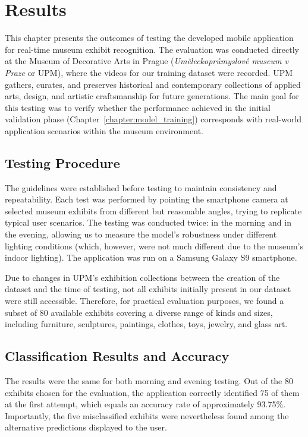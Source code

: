 \chapter{Results}

This chapter presents the outcomes of testing the developed mobile application for real-time museum exhibit recognition. The evaluation was conducted directly at the Museum of Decorative Arts in Prague (\textit{Uměleckoprůmyslové museum v Praze} or UPM), where the videos for our training dataset were recorded. UPM gathers, curates, and preserves historical and contemporary collections of applied arts, design, and artistic craftsmanship for future generations. The main goal for this testing was to verify whether the performance achieved in the initial validation phase (Chapter~\ref{chapter:model_training}) corresponds with real-world application scenarios within the museum environment.

\section{Testing Procedure}

The guidelines were established before testing to maintain consistency and repeatability. Each test was performed by pointing the smartphone camera at selected museum exhibits from different but reasonable angles, trying to replicate typical user scenarios. The testing was conducted twice: in the morning and in the evening, allowing us to measure the model's robustness under different lighting conditions (which, however, were not much different due to the museum's indoor lighting). The application was run on a Samsung Galaxy S9 smartphone.

Due to changes in UPM's exhibition collections between the creation of the dataset and the time of testing, not all exhibits initially present in our dataset were still accessible. Therefore, for practical evaluation purposes, we found a subset of 80 available exhibits covering a diverse range of kinds and sizes, including furniture, sculptures, paintings, clothes, toys, jewelry, and glass art.

\section{Classification Results and Accuracy}

The results were the same for both morning and evening testing. Out of the 80 exhibits chosen for the evaluation, the application correctly identified 75 of them at the first attempt, which equals an accuracy rate of approximately 93.75\%. Importantly, the five misclassified exhibits were nevertheless found among the alternative predictions displayed to the user.

